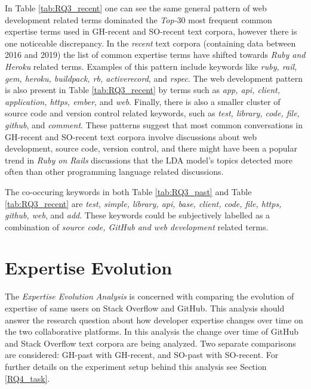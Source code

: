         In Table \ref{tab:RQ3_recent} one can see the same general pattern of web development related terms dominated the \emph{Top-$30$} most frequent common expertise terms used in GH-recent and SO-recent text corpora, however there is one noticeable discrepancy. In the \emph{recent} text corpora (containing data between 2016 and 2019) the list of common expertise terms have shifted towards \emph{Ruby and Heroku} related terms. Examples of this pattern include keywords like \emph{ruby, rail, gem, heroku, buildpack, rb, activerecord}, and \emph{rspec}. The web development pattern is also present in Table \ref{tab:RQ3_recent} by terms such as \emph{app, api, client, application, https, ember}, and \emph{web}. Finally, there is also a smaller cluster of source code and version control related keywords, such as \emph{test, library, code, file, github}, and \emph{comment}. These patterns suggest that most common conversations in GH-recent and SO-recent text corpora involve discussions about web development, source code, version control, and there might have been a popular trend in \emph{Ruby on Rails} discussions that the LDA model's topics detected more often than other programming language related discussions. 
        
        The co-occuring keywords in both Table \ref{tab:RQ3_past} and Table \ref{tab:RQ3_recent} are \emph{test, simple, library, api, base, client, code, file, https, github, web}, and \emph{add}. These keywords could be subjectively labelled as a combination of \emph{source code, GitHub and web development} related terms. \\
        
    
    \section{Expertise Evolution\label{sec:results_rq4}}
        
        The \emph{Expertise Evolution Analysis} is concerned with comparing the evolution of expertise of same users on Stack Overflow and GitHub. This analysis should answer the research question about how developer expertise changes over time on the two collaborative platforms. In this analysis the change over time of GitHub and Stack Overflow text corpora are being analyzed. Two separate comparisons are considered: GH-past with GH-recent, and SO-past with SO-recent. For further details on the experiment setup behind this analysis see Section \ref{RQ4_task}.
        
